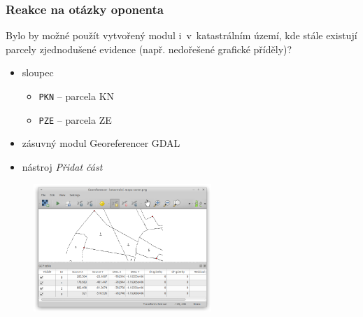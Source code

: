 \documentclass{beamer}
\begin{document}
\begin{frame}

\frametitle{Reakce na otázky oponenta}

Bylo by možné použít vytvořený modul i~v~katastrálním území, kde stále existují parcely zjednodušené evidence (např. nedořešené grafické příděly)?

\begin{itemize}
	\item sloupec \texttt{}
	\begin{itemize}
		\item \texttt{PKN} – parcela KN
		\item \texttt{PZE} – parcela ZE
	\end{itemize}
	\item zásuvný modul Georeferencer GDAL
	\item nástroj \textit{Přidat část}
\end{itemize}

\begin{figure}[ht]
	\includegraphics[width=0.6\textwidth]{pictures/georeferencer.png}
\end{figure}

\end{frame}

\end{document}
